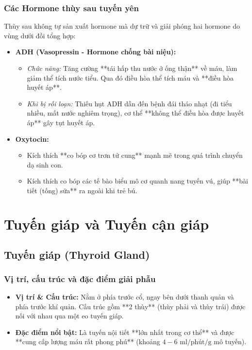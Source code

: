 \subsubsection{Các Hormone thùy sau tuyến yên}
Thùy sau không tự sản xuất hormone mà dự trữ và giải phóng hai hormone do vùng dưới đồi tổng hợp:
\begin{itemize}
    \item \textbf{ADH (Vasopressin - Hormone chống bài niệu):}
    \begin{itemize}
        \item \textit{Chức năng:} Tăng cường **tái hấp thu nước ở ống thận** về máu, làm giảm thể tích nước tiểu. Qua đó điều hòa thể tích máu và **điều hòa huyết áp**.
        \item \textit{Khi bị rối loạn:} Thiếu hụt ADH dẫn đến bệnh đái tháo nhạt (đi tiểu nhiều, mất nước nghiêm trọng), cơ thể **không thể điều hòa được huyết áp** gây tụt huyết áp.
    \end{itemize}

    \item \textbf{Oxytocin:}
    \begin{itemize}
        \item Kích thích **co bóp cơ trơn tử cung** mạnh mẽ trong quá trình chuyển dạ sinh con.
        \item Kích thích co bóp các tế bào biểu mô cơ quanh nang tuyến vú, giúp **bài tiết (tống) sữa** ra ngoài khi trẻ bú.
    \end{itemize}
\end{itemize}


\section{Tuyến giáp và Tuyến cận giáp}

\subsection{Tuyến giáp (Thyroid Gland)}

\subsubsection{Vị trí, cấu trúc và đặc điểm giải phẫu}
\begin{itemize}
    \item \textbf{Vị trí \& Cấu trúc:} Nằm ở phía trước cổ, ngay bên dưới thanh quản và phía trước khí quản. Cấu trúc gồm **2 thùy** (thùy phải và thùy trái) được nối với nhau qua một eo tuyến giáp.
    \item \textbf{Đặc điểm nổi bật:} Là tuyến nội tiết **lớn nhất trong cơ thể** và được **cung cấp lượng máu rất phong phú** (khoảng $4 - 6\text{ ml/phút/g}$ mô tuyến).
\end{itemize}

